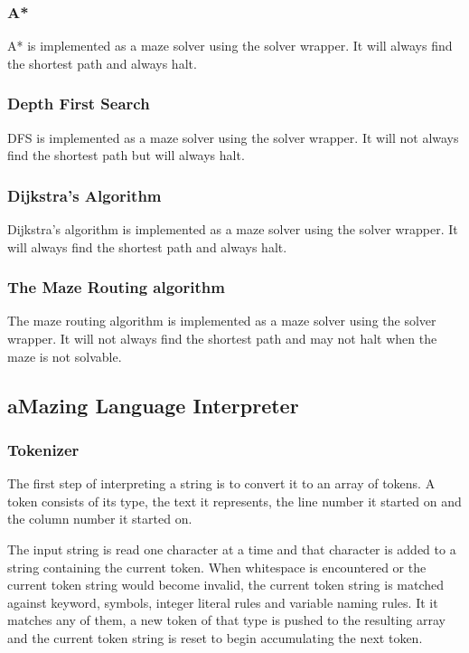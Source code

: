 \subsubsection{A*}

A* is implemented as a maze solver using the solver wrapper. It will always find the shortest path and always halt.

\subsubsection{Depth First Search}

DFS is implemented as a maze solver using the solver wrapper. It will not always find the shortest path but will always halt.

\subsubsection{Dijkstra's Algorithm}

Dijkstra's algorithm is implemented as a maze solver using the solver wrapper. It will always find the shortest path and always halt.

\subsubsection{The Maze Routing algorithm}

The maze routing algorithm is implemented as a maze solver using the solver wrapper. It will not always find the shortest path and may not halt when the maze is not solvable.

\subsection{aMazing Language Interpreter}

\subsubsection{Tokenizer}

The first step of interpreting a string is to convert it to an array of tokens. A token consists of its type, the text it represents, the line number it started on and the column number it started on.

The input string is read one character at a time and that character is added to a string containing the current token. When whitespace is encountered or the current token string would become invalid, the current token string is matched against keyword, symbols, integer literal rules and variable naming rules. It it matches any of them, a new token of that type is pushed to the resulting array and the current token string is reset to begin accumulating the next token.


